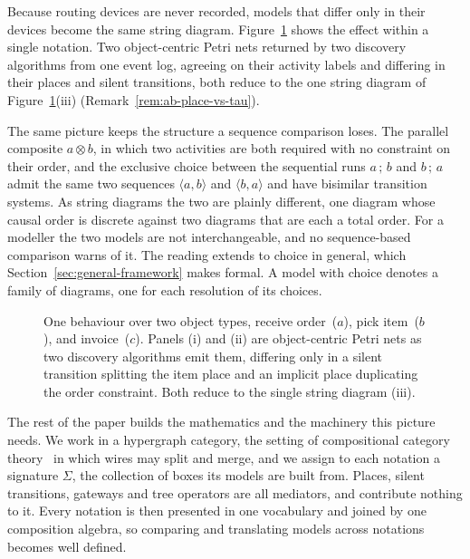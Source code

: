 Because routing devices are never recorded, models that differ only in their devices become the
same string diagram. Figure~\ref{fig:routing-collapse} shows the effect within a single notation.
Two object-centric Petri nets returned by two discovery algorithms from one event log, agreeing on
their activity labels and differing in their places and silent transitions, both reduce to the one
string diagram of Figure~\ref{fig:routing-collapse}(iii) (Remark~\ref{rem:ab-place-vs-tau}).

The same picture keeps the structure a sequence comparison loses. The parallel composite
$a\otimes b$, in which two activities are both required with no constraint on their order, and the
exclusive choice between the sequential runs $a\,;\,b$ and $b\,;\,a$ admit the same two sequences
$\langle a,b\rangle$ and $\langle b,a\rangle$ and have bisimilar transition systems. As string diagrams the two are plainly different, one diagram
whose causal order is discrete against two diagrams that are each a total order. For a modeller
the two models are not interchangeable, and no sequence-based comparison warns of it. The reading
extends to choice in general, which Section~\ref{sec:general-framework} makes formal. A
model with choice denotes a family of diagrams, one for each resolution of its choices.

\begin{figure}[!t]
  \centering
  \resizebox{\linewidth}{!}{\unskip}
  \caption{One behaviour over two object types, receive order~($a$), pick item~($b$), and
    invoice~($c$). Panels (i) and (ii) are object-centric Petri nets as two discovery algorithms
    emit them, differing only in a silent transition splitting the item place and an implicit
    place duplicating the order constraint. Both reduce to the single string diagram (iii).}
  \label{fig:routing-collapse}
\end{figure}

The rest of the paper builds the mathematics and the machinery this picture needs. We work in a
hypergraph category, the setting of compositional category
theory~\cite{fongHypergraphCategories2018} in which wires may split and merge, and we assign to each
notation a signature $\Sigma$, the collection of boxes its models are built from. Places,
silent transitions, gateways and tree operators are all mediators, and contribute nothing to it. Every notation is then presented in
one vocabulary and joined by one composition algebra, so comparing and translating models across
notations becomes well defined.

